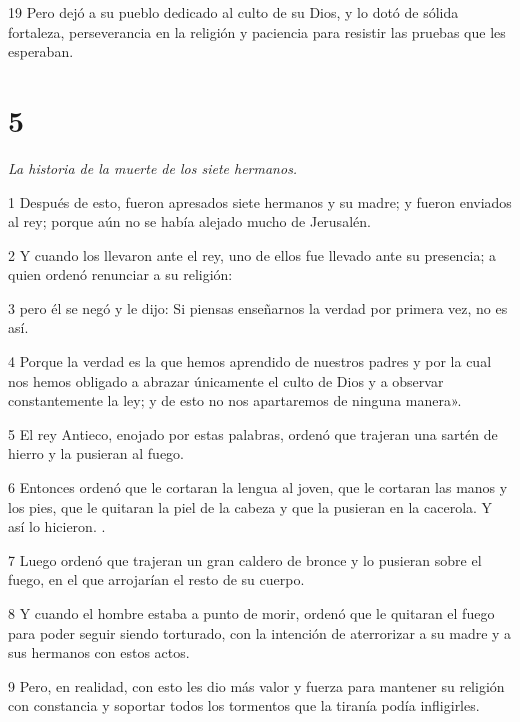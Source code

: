 \par 19 Pero dejó a su pueblo dedicado al culto de su Dios, y lo dotó de sólida fortaleza, perseverancia en la religión y paciencia para resistir las pruebas que les esperaban.

\chapter{5}

\par \textit{La historia de la muerte de los siete hermanos.}

\par 1 Después de esto, fueron apresados ​​siete hermanos y su madre; y fueron enviados al rey; porque aún no se había alejado mucho de Jerusalén.

\par 2 Y cuando los llevaron ante el rey, uno de ellos fue llevado ante su presencia; a quien ordenó renunciar a su religión:

\par 3 pero él se negó y le dijo: Si piensas enseñarnos la verdad por primera vez, no es así.

\par 4 Porque la verdad es la que hemos aprendido de nuestros padres y por la cual nos hemos obligado a abrazar únicamente el culto de Dios y a observar constantemente la ley; y de esto no nos apartaremos de ninguna manera».

\par 5 El rey Antieco, enojado por estas palabras, ordenó que trajeran una sartén de hierro y la pusieran al fuego.

\par 6 Entonces ordenó que le cortaran la lengua al joven, que le cortaran las manos y los pies, que le quitaran la piel de la cabeza y que la pusieran en la cacerola. Y así lo hicieron. .

\par 7 Luego ordenó que trajeran un gran caldero de bronce y lo pusieran sobre el fuego, en el que arrojarían el resto de su cuerpo.

\par 8 Y cuando el hombre estaba a punto de morir, ordenó que le quitaran el fuego para poder seguir siendo torturado, con la intención de aterrorizar a su madre y a sus hermanos con estos actos.

\par 9 Pero, en realidad, con esto les dio más valor y fuerza para mantener su religión con constancia y soportar todos los tormentos que la tiranía podía infligirles.

